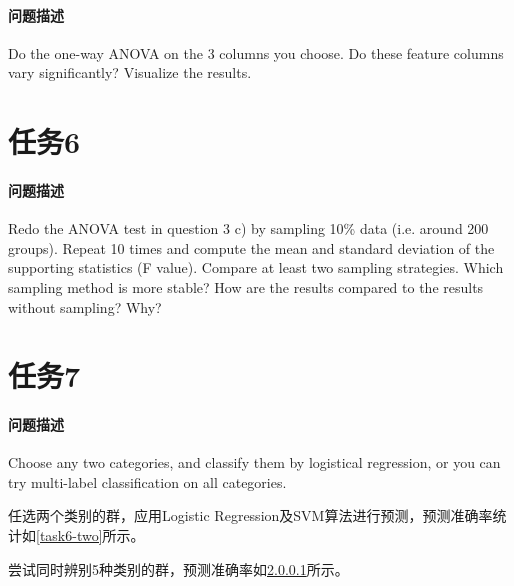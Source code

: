 \documentclass[a4paper,12pt]{article}
\begin{document}
    \paragraph{问题描述} Do the one-way ANOVA on the 3 columns you choose. Do these feature columns vary significantly? Visualize the results.
    
    \section{任务6} %
    \paragraph{问题描述} Redo the ANOVA test in question 3 c) by sampling 10\% data (i.e. around 200 groups). Repeat 10 times and compute the mean and standard deviation of the supporting statistics (F value). Compare at least two sampling strategies. Which sampling method is more stable? How are the results compared to the results without sampling? Why?
    \section{任务7} %
    \paragraph{问题描述} Choose any two categories, and classify them by logistical regression, or you can try multi-label classification on all categories.

    任选两个类别的群，应用Logistic Regression及SVM算法进行预测，预测准确率统计如\cref{task6-two}所示。
    

    尝试同时辨别5种类别的群，预测准确率如\cref{}所示。
    
    \label{applastpage}
    \newpage
    
    
\iffalse
\begin{itemize}[noitemsep,topsep=0pt]
\end{itemize}
\begin{enumerate}[label=\Roman{*}.,noitemsep,topsep=0pt]
\end{enumerate}
\begin{multicols}{2}
\end{multicols}
\fi
\end{document}
